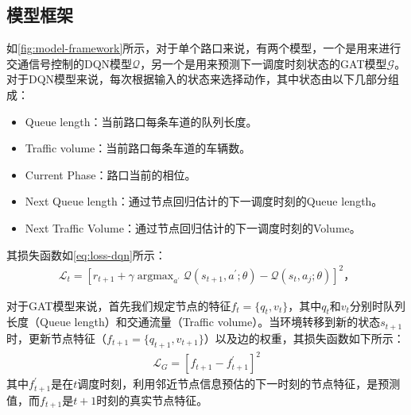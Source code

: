\subsection{模型框架}
如\autoref{fig:model-framework}所示，对于单个路口来说，有两个模型，一个是用来进行交通信号控制的DQN模型$\mathcal{Q}$，另一个是用来预测下一调度时刻状态的GAT模型$\mathcal{G}$。
对于DQN模型来说，每次根据输入的状态来选择动作，其中状态由以下几部分组成：
\begin{itemize}
  \item Queue length：当前路口每条车道的队列长度。
  \item Traffic volume：当前路口每条车道的车辆数。
  \item Current Phase：路口当前的相位。
  \item Next Queue length：通过节点回归估计的下一调度时刻的Queue length。
  \item Next Traffic Volume：通过节点回归估计的下一调度时刻的Volume。
\end{itemize}
其损失函数如\autoref{eq:loss-dqn}所示：
\begin{align}
  \label{eq:loss-dqn}
  \mathcal{L}_t=[ r_{t+1}+\gamma \mathop{\arg\max}_{a^{\prime}} \mathcal{Q}(s_{t+1},a^{'};\theta)-\mathcal{Q}(s_t,a_j;\theta)]^2，
\end{align}

对于GAT模型来说，首先我们规定节点的特征$f_t=\{q_t, v_t\}$，其中$q_t$和$v_t$分别时队列长度（Queue length）和交通流量（Traffic volume）。当环境转移到新的状态$s_{t+1}$时，更新节点特征（$f_{t+1}=\{q_{t+1},v_{t+1}\}$）以及边的权重，其损失函数如下所示：
\begin{align}
  \label{eq:loss-gat}
  \mathcal{L}_G = [f_{t+1} - f_{t+1}^{\prime}]^2
\end{align}
其中$f_{t+1}^{\prime}$是在$t$调度时刻，利用邻近节点信息预估的下一时刻的节点特征，是预测值，而$f_{t+1}$是$t+1$时刻的真实节点特征。

